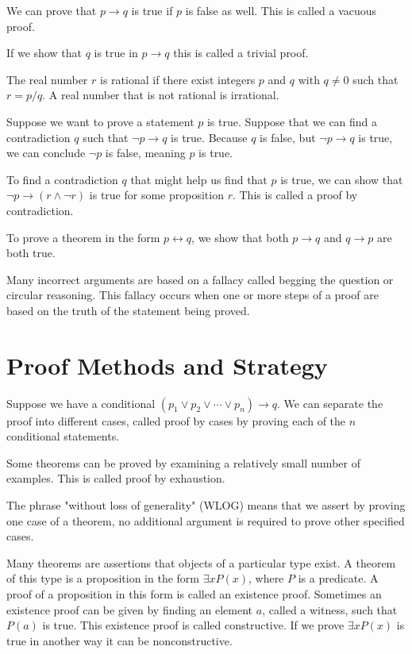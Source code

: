 \documentclass[../discrete.tex]{subfiles}
\begin{document}
We can prove that $p\rightarrow q$ is true if $p$ is false as well. This is called a vacuous proof. 

If we show that $q$ is true in $p\rightarrow q$ this is called a trivial proof. 
\begin{definition}
    The real number $r$ is rational if there exist integers $p$ and $q$ with $q\neq 0$ such that $r=p/q$. 
    A real number that is not rational is irrational.
\end{definition}

Suppose we want to prove a statement $p$ is true. Suppose that we can find a contradiction $q$ such that 
$\neg p \rightarrow q$ is true. Because $q$ is false, but $\neg p \rightarrow q$ is true, we can conclude 
$\neg p$ is false, meaning $p$ is true. 

To find a contradiction $q$ that might help us find that $p$ is true, we can show that 
$\neg p \rightarrow (r\land \neg r)$ is true for some proposition $r$. This is called a proof by contradiction. 

To prove a theorem in the form $p\leftrightarrow q$, we show that both $p\rightarrow q$ and $q\rightarrow p$ are both true. 

Many incorrect arguments are based on a fallacy called begging the question or circular reasoning. 
This fallacy occurs when one or more steps of a proof are based on the truth of the statement being proved.

\section{Proof Methods and Strategy}
Suppose we have a conditional $(p_1\lor p_2\lor \cdots \lor p_n)\rightarrow q$. We can separate the 
proof into different cases, called proof by cases by proving each of the $n$ conditional statements.

Some theorems can be proved by examining a relatively small number of examples. This is called proof by exhaustion. 

The phrase "without loss of generality" (WLOG) means that we assert by proving one case of a theorem, 
no additional argument is required to prove other specified cases. 

Many theorems are assertions that objects of a particular type exist. A theorem of this type is a 
proposition in the form $\exists xP(x)$, where $P$ is a predicate. A proof of a proposition in this 
form is called an existence proof. Sometimes an existence proof can be given by finding an element $a$, 
called a witness, such that $P(a)$ is true. This existence proof is called constructive. If we prove 
$\exists xP(x)$ is true in another way it can be nonconstructive.
\end{document}
